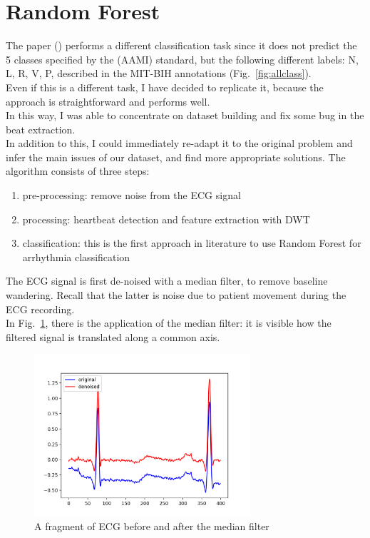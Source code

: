 \documentclass[LaM,binding=0.6cm]{sapthesis}
\begin{document}
\section{Random Forest \cite{forest}}
The paper (\cite{forest}) performs  a different classification task since it does not predict the 5 classes specified by the (AAMI) standard, but the following different labels: N, L, R, V, P, described in the MIT-BIH annotations (Fig.~\ref{fig:allclass}).\\Even if this is a different task, I have decided to replicate it, because the approach is straightforward and performs well.\\In this way, I was able to concentrate on dataset building and fix some bug in the beat extraction.\\In addition to this, I could immediately re-adapt it to the original problem and infer the main issues of our dataset, and find more appropriate solutions.
The algorithm consists of three steps:
\begin{enumerate}
\item pre-processing: remove noise from the ECG signal
\item processing: heartbeat detection and feature extraction with DWT
\item classification: this is the first approach in literature to use Random Forest for arrhythmia classification
\end{enumerate} 
The ECG signal is first de-noised with a median filter, to remove baseline wandering. Recall that the latter is noise due to patient movement during the ECG recording.\\In Fig.~\ref{fig:rf1}, there is the application of the median filter: it is visible how the filtered signal is translated along a common axis. 
\begin{figure}[H]  \centering
    \includegraphics[width=80mm,scale=0.7]{random-forest-before-after}
    \caption{A fragment of ECG before and after the median filter}
    \label{fig:rf1}
\end{figure}
\end{document}
